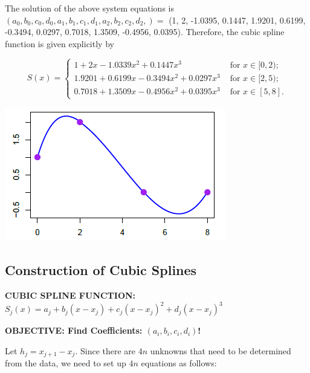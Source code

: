 \documentclass[
]{book}
\begin{document}
The solution of the above system equations is \((a_0, b_0, c_0, d_0, a_1, b_1, c_1, d_1,a_2, b_2, c_2, d_2,) =\) (1, 2, -1.0395, 0.1447, 1.9201, 0.6199, -0.3494, 0.0297, 0.7018, 1.3509, -0.4956, 0.0395). Therefore, the cubic spline function is given explicitly by

\[
S(x)=
    \begin{cases}
        1 + 2x-1.0339x^2+0.1447x^3  & \text{ for } x\in[0, 2);\\
        1.9201+0.6199x-0.3494x^2+0.0297x^3   & \text{ for } x\in[2, 5);\\
        0.7018+1.3509x-0.4956x^2+0.0395x^3  & \text{ for } x\in[5, 8] .
    \end{cases}
\]

\begin{center}\includegraphics[width=0.45\linewidth]{img11/16-clumpedSplineCurve} \end{center}

\hfill\break

\hypertarget{construction-of-cubic-splines}{%
\subsection{Construction of Cubic Splines}\label{construction-of-cubic-splines}}

\hfill\break

\textbf{\color{blue}CUBIC SPLINE FUNCTION: \(S_j(x) = a_j + b_j(x-x_j) + c_j(x-x_j)^2 + d_j(x-x_j)^3\)}

\hfill\break
\textbf{\color{blue}OBJECTIVE: Find Coefficients: \((a_i, b_i, c_i, d_i)\)!}\\

\hfill\break

Let \(h_j = x_{j+1} - x_j\). Since there are \(4n\) unknowns that need to be determined from the data, we need to set up \(4n\) equations as follows:
\end{document}
